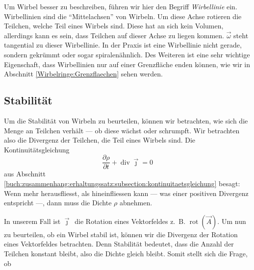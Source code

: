 Um Wirbel besser zu beschreiben, führen wir hier den Begriff {\em Wirbellinie} ein.
%
Wirbellinien sind die ``Mittelachsen'' von Wirbeln. 
Um diese Achse rotieren die Teilchen, welche Teil eines Wirbels sind. 
Diese hat an sich kein Volumen, allerdings kann es sein, dass Teilchen auf dieser Achse zu liegen kommen. 
\(\vec{\omega}\) steht tangential zu dieser Wirbellinie.  
In der Praxis ist eine Wirbellinie nicht gerade, sondern gekrümmt oder sogar spiralenähnlich. 
Des Weiteren ist eine sehr wichtige Eigenschaft, dass Wirbellinien nur auf einer Grenzfläche enden können, 
wie wir in Abschnitt \ref{Wirbelringe:Grenzflaechen} sehen werden.

\subsection{Stabilität}
%
Um die Stabilität von Wirbeln zu beurteilen, können wir betrachten, wie sich die Menge an Teilchen verhält --- ob diese wächst oder schrumpft. 
Wir betrachten also die Divergenz der Teilchen, die Teil eines Wirbels sind.
Die Kontinuitätsgleichung 
%
\[
\frac{\partial \rho}{\partial t}
+
\operatorname{div}\vec{\jmath}
=
0
\]
aus Abschnitt \ref{buch:zusammenhang:erhaltungssatz:subsection:kontinuitaetsgleichung} besagt: Wenn mehr herausfliesst, als hineinfliessen kann --- was einer positiven Divergenz entspricht ---, dann muss die Dichte \(\rho\) abnehmen.

In unserem Fall ist \(\vec{\jmath}\,\) die Rotation eines Vektorfeldes z.~B. \(\operatorname{rot}(\vec{A})\).
Um nun zu beurteilen, ob ein Wirbel stabil ist, können wir die Divergenz der Rotation eines Vektorfeldes betrachten.
Denn Stabilität bedeutet, dass die Anzahl der Teilchen konstant bleibt, also die Dichte gleich bleibt.
Somit stellt sich die Frage, ob


